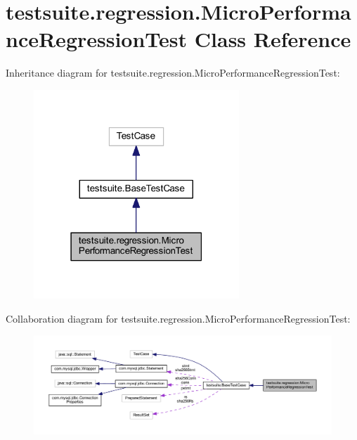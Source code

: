 \hypertarget{classtestsuite_1_1regression_1_1_micro_performance_regression_test}{}\section{testsuite.\+regression.\+Micro\+Performance\+Regression\+Test Class Reference}
\label{classtestsuite_1_1regression_1_1_micro_performance_regression_test}


Inheritance diagram for testsuite.\+regression.\+Micro\+Performance\+Regression\+Test\+:
\nopagebreak
\begin{figure}[H]
\begin{center}
\leavevmode
\includegraphics[width=219pt]{classtestsuite_1_1regression_1_1_micro_performance_regression_test__inherit__graph}
\end{center}
\end{figure}


Collaboration diagram for testsuite.\+regression.\+Micro\+Performance\+Regression\+Test\+:
\nopagebreak
\begin{figure}[H]
\begin{center}
\leavevmode
\includegraphics[width=350pt]{classtestsuite_1_1regression_1_1_micro_performance_regression_test__coll__graph}
\end{center}
\end{figure}
